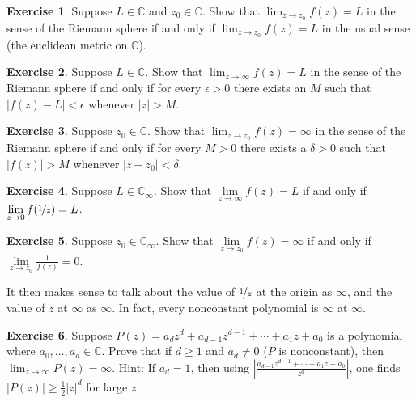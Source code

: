 \documentclass[12pt,openany]{book}
\newcommand{\sabs}[1]{\lvert {#1} \rvert}
\newcommand{\abs}[1]{\left\lvert {#1} \right\rvert}
\newcommand{\C}{{\mathbb{C}}}
\theoremstyle{plain}
\theoremstyle{remark}
\theoremstyle{definition}
\newenvironment{exbox}{%
    \def\FrameCommand{\vrule width 1pt \relax\hspace{10pt}}%
    \MakeFramed{\advance\hsize-\width\FrameRestore}%
}{%
    \endMakeFramed
}
\theoremstyle{exercise}
\newtheorem{exercise}{Exercise}[section]
\theoremstyle{example}
\begin{document}
\begin{exbox}
\begin{exercise}%
Suppose $L \in \C$ and $z_0 \in \C$.
Show that $\lim_{z\to z_0} f(z) = L$ in the sense of the Riemann sphere
if and only if $\lim_{z \to z_0} f(z) = L$ in the usual sense (the euclidean
metric on $\C$).
\end{exercise}

\begin{exercise}%
Suppose $L \in \C$.
Show that $\lim_{z\to \infty} f(z) = L$ in the sense of the Riemann sphere
if and only if for every $\epsilon > 0$ there exists an $M$ such that
$\sabs{f(z)-L} < \epsilon$ whenever $\sabs{z} > M$.
\end{exercise}

\begin{exercise}%
Suppose $z_0 \in \C$.
Show that $\lim_{z\to z_0} f(z) = \infty$ in the sense of the Riemann sphere
if and only if for every $M > 0$ there exists a $\delta > 0$ such that
$\sabs{f(z)} > M$ whenever $\sabs{z-z_0} < \delta$.
\end{exercise}

\begin{exercise}%
Suppose $L \in \C_\infty$.
Show that $\lim\limits_{z\to\infty} f(z) = L$ if and only if
$\lim\limits_{z \to 0} f(\nicefrac{1}{z}) = L$.
\end{exercise}

\begin{exercise}%
Suppose $z_0 \in \C_\infty$.
Show that $\lim\limits_{z\to z_0} f(z) = \infty$ if and only if
$\lim\limits_{z \to z_0} \frac{1}{f(z)} = 0$.
\end{exercise}
\end{exbox}

It then makes sense to talk about the value of $\nicefrac{1}{z}$ at the origin
as $\infty$, and the value of $z$ at $\infty$ as $\infty$.
In fact, every nonconstant polynomial is $\infty$ at $\infty$.

\begin{exbox}
\begin{exercise}%
\label{exercise:polygoesinf}
Suppose $P(z) = a_d z^d + a_{d-1} z^{d-1} + \cdots + a_1 z + a_0$ is
a polynomial where $a_0,\ldots,a_d \in \C$.  Prove that if $d \geq 1$
and $a_d \not=0$ ($P$ is nonconstant),
then $\lim_{z \to \infty} P(z) = \infty$.
Hint: If $a_d = 1$, then using
$\abs{\frac{a_{d-1} z^{d-1} + \cdots + a_1 z + a_0}{z^d}}$, one finds
$\abs{P(z)} \geq \frac{1}{2} \sabs{z}^d$ for large $z$.
\end{exercise}
\end{exbox}
\end{document}
